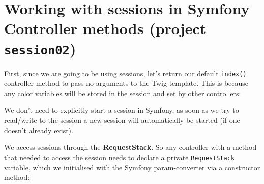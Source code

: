 \documentclass[a4paperpaper,openright]{book}
\newenvironment{Shaded}{}{}
\newcommand{\CommentTok}[1]{\textcolor[rgb]{0.38,0.63,0.69}{\textit{#1}}}
\newcommand{\FunctionTok}[1]{\textcolor[rgb]{0.02,0.16,0.49}{#1}}
\newcommand{\KeywordTok}[1]{\textcolor[rgb]{0.00,0.44,0.13}{\textbf{#1}}}
\newcommand{\NormalTok}[1]{#1}
\newcommand{\OtherTok}[1]{\textcolor[rgb]{0.00,0.44,0.13}{#1}}
\newcommand{\StringTok}[1]{\textcolor[rgb]{0.25,0.44,0.63}{#1}}
\begin{document}
\hypertarget{working-with-sessions-in-symfony-controller-methods-project-session02}{%
\section{\texorpdfstring{Working with sessions in Symfony Controller
methods (project
\texttt{session02})}{Working with sessions in Symfony Controller methods (project session02)}}\label{working-with-sessions-in-symfony-controller-methods-project-session02}}

First, since we are going to be using sessions, let's return our default
\texttt{index()} controller method to pass no arguments to the Twig
template. This is because any color variables will be stored in the
session and set by other controllers:

\begin{Shaded}
\end{Shaded}

We don't need to explicitly start a session in Symfony, as soon as we
try to read/write to the session a new session will automatically be
started (if one doesn't already exist).

We access sessions through the \textbf{RequestStack}. So any controller
with a method that needed to access the session needs to declare a
private \texttt{RequestStack} variable, which we initialised with the
Symfony param-converter via a constructor method:

\begin{Shaded}
\end{Shaded}
\end{document}
